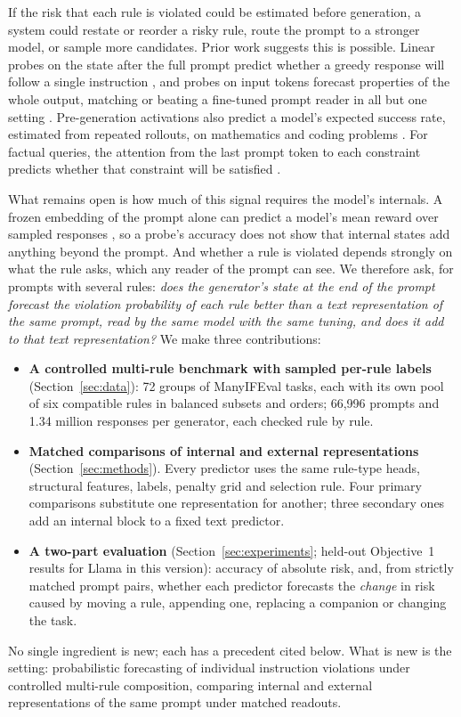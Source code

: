 \documentclass{article}
\begin{document}
If the risk that each rule is violated could be estimated before generation, a system could restate or reorder a
risky rule, route the prompt to a stronger model, or sample more candidates. Prior work suggests this is possible. Linear probes on the state after the full prompt predict whether a greedy response will follow a
single instruction \citep{heo2025know}, and probes on input tokens forecast properties of the whole output, matching
or beating a fine-tuned prompt reader in all but one setting \citep{ashok2025predict}. Pre-generation activations also predict a model's
expected success rate, estimated from repeated rollouts, on mathematics and coding problems
\citep{lugoloobi2026encode}. For factual queries, the attention from the last prompt token to each constraint
predicts whether that constraint will be satisfied \citep{yuksekgonul2024attention}.

What remains open is how much of this signal requires the model's internals. A frozen embedding of the prompt alone
can predict a model's mean reward over sampled responses \citep{hasanaliyev2026expected}, so a probe's accuracy does
not show that internal states add anything beyond the prompt. And whether a rule is violated depends strongly on what
the rule asks, which any reader of the prompt can see. We therefore ask, for prompts with several rules: \emph{does the
generator's state at the end of the prompt forecast the violation probability of each rule better than a text
representation of the same prompt, read by the same model with the same tuning, and does it add to that text
representation?} We make three contributions:
\begin{itemize}
\item \textbf{A controlled multi-rule benchmark with sampled per-rule labels} (Section~\ref{sec:data}): 72 groups
of ManyIFEval tasks, each with its own pool of six compatible rules in balanced subsets and orders; 66,996 prompts and
1.34 million responses per generator, each checked rule by rule.
\item \textbf{Matched comparisons of internal and external representations} (Section~\ref{sec:methods}). Every
predictor uses the same rule-type heads, structural features, labels, penalty grid and selection rule. Four primary
comparisons substitute one representation for another; three secondary ones add an internal block to a fixed text
predictor.
\item \textbf{A two-part evaluation} (Section~\ref{sec:experiments}; held-out Objective~1 results for Llama in this version): accuracy of absolute risk, and, from strictly matched prompt pairs, whether each predictor forecasts the \emph{change} in risk caused by
moving a rule, appending one, replacing a companion or changing the task.
\end{itemize}
No single ingredient is new; each has a precedent cited below. What is new is the setting: probabilistic forecasting
of individual instruction violations under controlled multi-rule composition, comparing internal and external
representations of the same prompt under matched readouts.
\end{document}
